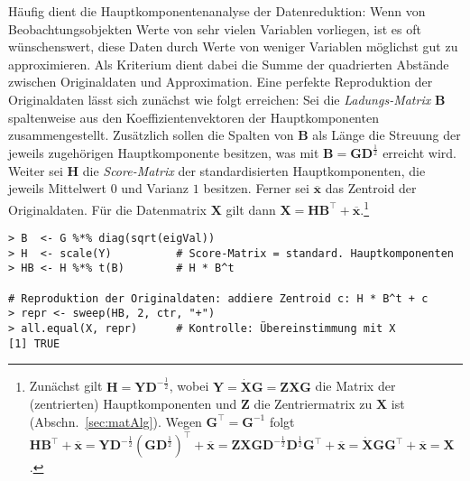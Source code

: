 Häufig dient die Hauptkomponentenanalyse der Datenreduktion: Wenn von Beobachtungsobjekten Werte von sehr vielen Variablen vorliegen, ist es oft wünschenswert, diese Daten durch Werte von weniger Variablen möglichst gut zu approximieren. Als Kriterium dient dabei die Summe der quadrierten Abstände zwischen Originaldaten und Approximation. Eine perfekte Reproduktion der Originaldaten lässt sich zunächst wie folgt erreichen: Sei die \emph{Ladungs-Matrix} $\bm{B}$ spaltenweise aus den Koeffizientenvektoren der Hauptkomponenten zusammengestellt. Zusätzlich sollen die Spalten von $\bm{B}$ als Länge die Streuung der jeweils zugehörigen Hauptkomponente besitzen, was mit $\bm{B} = \bm{G} \bm{D}^{\frac{1}{2}}$ erreicht wird. Weiter sei $\bm{H}$ die \emph{Score-Matrix} der standardisierten Hauptkomponenten, die jeweils Mittelwert $0$ und Varianz $1$ besitzen. Ferner sei $\overline{\bm{x}}$ das Zentroid der Originaldaten. Für die Datenmatrix $\bm{X}$ gilt dann $\bm{X} = \bm{H} \bm{B}^{\top} + \overline{\bm{x}}$.\footnote{Zunächst gilt $\bm{H} = \bm{Y} \bm{D}^{-\frac{1}{2}}$, wobei $\bm{Y} = \dot{\bm{X}} \bm{G} = \bm{Z} \bm{X} \bm{G}$ die Matrix der (zentrierten) Hauptkomponenten und $\bm{Z}$ die Zentriermatrix zu $\bm{X}$ ist (Abschn.\ \ref{sec:matAlg}). Wegen $\bm{G}^{\top} = \bm{G}^{-1}$ folgt $\bm{H} \bm{B}^{\top} + \overline{\bm{x}} = \bm{Y} \bm{D}^{-\frac{1}{2}} (\bm{G} \bm{D}^{\frac{1}{2}})^{\top} + \overline{\bm{x}} = \bm{Z} \bm{X} \bm{G} \bm{D}^{-\frac{1}{2}} \bm{D}^{\frac{1}{2}} \bm{G}^{\top} + \overline{\bm{x}} = \dot{\bm{X}} \bm{G} \bm{G}^{\top} + \overline{\bm{x}} = \bm{X}$.}
\begin{lstlisting}
> B  <- G %*% diag(sqrt(eigVal))
> H  <- scale(Y)          # Score-Matrix = standard. Hauptkomponenten
> HB <- H %*% t(B)        # H * B^t

# Reproduktion der Originaldaten: addiere Zentroid c: H * B^t + c
> repr <- sweep(HB, 2, ctr, "+")
> all.equal(X, repr)      # Kontrolle: Übereinstimmung mit X
[1] TRUE
\end{lstlisting}

